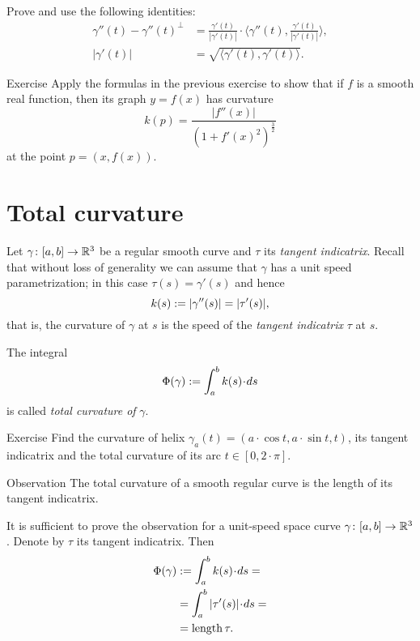  Prove and use the following identities: 
\begin{align*}
\gamma''(t)-\gamma''(t)^\perp&=\tfrac{\gamma'(t)}{|\gamma'(t)|}\cdot\langle\gamma''(t),\tfrac{\gamma'(t)}{|\gamma'(t)|}\rangle,
\\
|\gamma'(t)|&=\sqrt{\langle \gamma'(t),\gamma'(t)\rangle}.\
\end{align*}


\begin{thm}{Exercise}\label{ex:curvature-graph}
Apply the formulas in the previous exercise to show that if $f$ is a smooth real function,
then its graph $y=f(x)$  has curvature
\[k(p)=\frac{|f''(x)|}{(1+f'(x)^2)^{\frac32}}\]
at the point $p=(x,f(x))$.
\end{thm}

\section*{Total curvature}

Let $\gamma\colon[a,b]\to\mathbb{R}^3$ be a regular smooth curve and $\tau$ its \emph{tangent indicatrix}.
Recall that without loss of generality we can assume that $\gamma$ has a unit speed parametrization;
in this case $\tau(s)=\gamma'(s)$ and hence
\[k(s):=|\gamma''(s)|=|\tau'(s)|,\] 
that is, the curvature of $\gamma$ at $s$ is the speed of the \emph{tangent indicatrix} $\tau$ at $s$.

The integral 
\[\tc\gamma:=\int_a^bk(s)\cdot ds\]
is called \emph{total curvature of} $\gamma$.

\begin{thm}{Exercise}\label{ex:helix-curvature}
Find the curvature of helix $\gamma_a(t)=(a\cdot \cos t,a\cdot \sin t,t)$, its tangent indicatrix and the total curvature of its arc $t\in[0,2\cdot\pi]$.
\end{thm}

\begin{thm}{Observation}\label{obs:tantrix}
The total curvature of a smooth regular curve is the length of its tangent indicatrix.
\end{thm}

It is sufficient to prove the observation for a unit-speed space curve $\gamma\colon[a,b]\to\mathbb{R}^3$.
Denote by $\tau$ its tangent indicatrix.
Then
\begin{align*}
\tc\gamma&\df\int_a^bk(s)\cdot ds=
\\
&=\int_a^b|\tau'(s)|\cdot ds=
\\
&=\length\tau.
\end{align*}
\qedsf %

